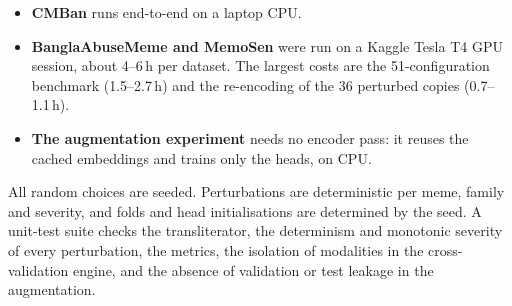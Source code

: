 \begin{itemize}
  \item \textbf{CMBan} runs end-to-end on a laptop CPU.
  \item \textbf{BanglaAbuseMeme and MemoSen} were run on a Kaggle Tesla T4 GPU session, about 4--6\,h per dataset.
  The largest costs are the 51-configuration benchmark (1.5--2.7\,h) and the re-encoding of the 36 perturbed
  copies (0.7--1.1\,h).
  \item \textbf{The augmentation experiment} needs no encoder pass: it reuses the cached embeddings and trains only
  the heads, on CPU.
\end{itemize}

All random choices are seeded. Perturbations are deterministic per meme, family and severity, and folds and head
initialisations are determined by the seed. A unit-test suite checks the transliterator, the determinism and
monotonic severity of every perturbation, the metrics, the isolation of modalities in the cross-validation engine,
and the absence of validation or test leakage in the augmentation.
